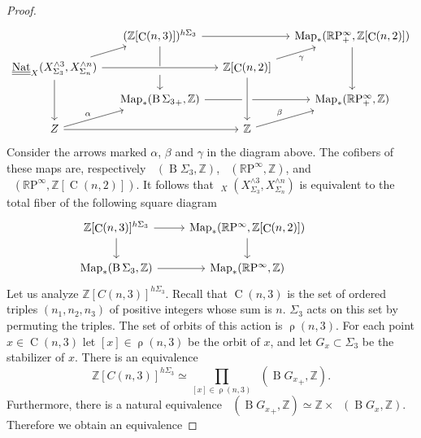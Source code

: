 \documentclass[10pt,a4paper]{amsart}
\DeclareMathOperator{\Comp}{C}
\DeclareMathOperator{\Part}{\rho}
\newcommand{\RP}{\mathbb{R}\mathrm{P}}
\newcommand{\Z}{\mathbb{Z}}
\newcommand{\classifying}{\operatorname{B}}
\DeclareMathOperator{\map}{Map}
\DeclareMathOperator{\nat}{Nat}
\DeclareMathOperator{\pointedmaps}{\map_*}
\DeclareMathOperator{\spectralNat}{\underline{\underline{\nat}}}
\begin{document}
\begin{proof}
\[\begin{tikzcd}[sep=small]
	& {(\Z[\Comp(n, 3)])^{h\Sigma_3}} && {\pointedmaps(\RP^\infty_+, \Z[\Comp(n, 2)])} \\
	{\spectralNat_X(X^{\wedge 3}_{\Sigma_3}, X^{\wedge n}_{\Sigma_n})} & {} & {\Z[\Comp(n, 2)]} \\
	& {\pointedmaps({\classifying \Sigma_3}_+, \Z)} & {} & {\pointedmaps(\RP^\infty_+, \Z)} \\
	{ Z} && {\Z}
	\arrow[from=1-2, to=1-4]
	\arrow[no head, from=1-2, to=2-2]
	\arrow[from=1-4, to=3-4]
	\arrow[from=2-1, to=1-2]
	\arrow[from=2-1, to=2-3]
	\arrow[from=2-1, to=4-1]
	\arrow[from=2-2, to=3-2]
	\arrow[swap, "\gamma", from=2-3, to=1-4]
	\arrow[""{name=0, anchor=center, inner sep=0}, from=2-3, to=4-3]
	\arrow[from=3-3, to=3-4]
	\arrow["\alpha", from=4-1, to=3-2]
	\arrow[from=4-1, to=4-3]
	\arrow["\beta", from=4-3, to=3-4]
	\arrow[no head, from=3-2, to=3-3]
\end{tikzcd}\]
Consider the arrows marked $\alpha$, $\beta$ and $\gamma$ in the diagram above. The cofibers of these maps are, respectively $\pointedmaps(\classifying\Sigma_3, \Z)$, $\pointedmaps(\RP^\infty, \Z)$, and $\pointedmaps(\RP^\infty, \Z[\Comp(n, 2)])$. It follows that $\spectralNat_X(X^{\wedge 3}_{\Sigma_3}, X^{\wedge n}_{\Sigma_n})$ is equivalent to the total fiber of the following square diagram
\begin{equation}\label{eq:flattened cube}
\begin{tikzcd}
	{\Z[\Comp(n,3)]^{h\Sigma_3}} & {\pointedmaps(\RP^\infty, \Z[\Comp(n,2)])} & {} \\
	{\pointedmaps({\classifying \Sigma_3}, \Z)} & {\pointedmaps(\RP^\infty, \Z)}
	\arrow[from=1-1, to=1-2]
	\arrow[from=1-1, to=2-1]
	\arrow[from=1-2, to=2-2]
	\arrow[from=2-1, to=2-2]
\end{tikzcd}
\end{equation}
Let us analyze $\Z[C(n, 3)]^{h\Sigma_3}$.
Recall that $\Comp(n, 3)$ is the set of ordered triples $(n_1, n_2, n_3)$ of positive integers whose sum is $n$. $\Sigma_3$ acts on this set by permuting the triples. The set of orbits of this action is $\Part(n, 3)$. For each point $x\in \Comp(n, 3)$ let $[x]\in \Part(n, 3)$ be the orbit of $x$, and let $G_x\subset \Sigma_3$ be the stabilizer of $x$. There is an equivalence
\[
\Z[C(n, 3)]^{h\Sigma_3} \simeq \prod_{[x]\in \Part(n, 3)}\pointedmaps (\classifying {G_x}_+,\Z).
\]
Furthermore, there is a natural equivalence $\pointedmaps(\classifying {G_x}_+, \Z)\simeq \Z\times \pointedmaps(\classifying G_x, \Z).$ Therefore we obtain an equivalence

\end{proof}
\end{document}
